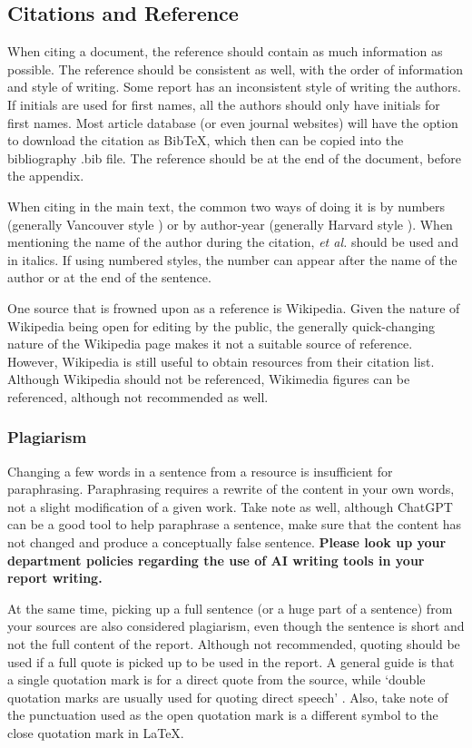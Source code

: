 \subsection{Citations and Reference}
When citing a document, the reference should contain as much information as possible. The reference should be consistent as well, with the order of information and style of writing. Some report has an inconsistent style of writing the authors. If initials are used for first names, all the authors should only have initials for first names. Most article database (or even journal websites) will have the option to download the citation as BibTeX, which then can be copied into the bibliography .bib file. The reference should be at the end of the document, before the appendix. 

When citing in the main text, the common two ways of doing it is by numbers (generally Vancouver style \cite{Imper_VancouverGuide}) or by author-year (generally Harvard style \cite{Imper_HarvGuide}). When mentioning the name of the author during the citation, \textit{et al.} should be used and in italics. If using numbered styles, the number can appear after the name of the author or at the end of the sentence. 

One source that is frowned upon as a reference is Wikipedia. Given the nature of Wikipedia being open for editing by the public, the generally quick-changing nature of the Wikipedia page makes it not a suitable source of reference. However, Wikipedia is still useful to obtain resources from their citation list. Although Wikipedia should not be referenced, Wikimedia figures can be referenced, although not recommended as well. 

\subsubsection{Plagiarism}
Changing a few words in a sentence from a resource is insufficient for paraphrasing. Paraphrasing requires a rewrite of the content in your own words, not a slight modification of a given work. Take note as well, although ChatGPT can be a good tool to help paraphrase a sentence, make sure that the content has not changed and produce a conceptually false sentence. \textbf{Please look up your department policies regarding the use of AI writing tools in your report writing. }

At the same time, picking up a full sentence (or a huge part of a sentence) from your sources are also considered plagiarism, even though the sentence is short and not the full content of the report. Although not recommended, quoting should be used if a full quote is picked up to be used in the report. A general guide is that a single quotation mark is for a direct quote from the source, while `double quotation marks are usually used for quoting direct speech' \cite[p.~6]{Imper_VancouverGuide}. Also, take note of the punctuation used as the open quotation mark is a different symbol to the close quotation mark in \LaTeX. 

